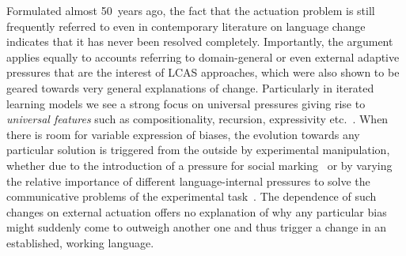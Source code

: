 Formulated almost 50~years ago, the fact that the actuation problem is still frequently referred to even in contemporary literature on language change indicates that it has never been resolved completely. Importantly, the argument applies equally to accounts referring to domain-general or even external adaptive pressures that are the interest of LCAS approaches, which were also shown to be geared towards very general explanations of change. Particularly in iterated learning models we see a strong focus on universal pressures giving rise to \emph{universal features} such as compositionality, recursion, expressivity etc.~\citep{Brighton2002,Kirby2002,Cornish2009,Smith2013,Kirby2015}. %
When there is room for variable expression of biases, the evolution towards any particular solution is triggered from the outside by experimental manipulation, whether due to the introduction of a pressure for social marking~\citep{Roberts2013} or by varying the relative importance of different language-internal pressures to solve the communicative problems of the experimental task~\citep{Winters2015}. The dependence of such changes on external actuation offers no explanation of why any particular bias might suddenly come to outweigh another one and thus trigger a change in an established, working language.


